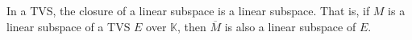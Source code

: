 In a TVS, the closure of a linear subspace is a linear subspace. That is, if $M$ is a linear subspace of a TVS $E$ over $\mathbb{K}$, then $\overline{M}$ is also a linear subspace of $E$.
